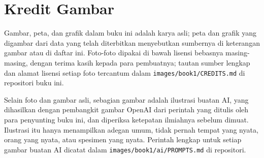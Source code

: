 \chapter*{Kredit Gambar}

Gambar, peta, dan grafik dalam buku ini adalah karya asli; peta dan grafik
yang digambar dari data yang telah diterbitkan menyebutkan sumbernya di
keterangan gambar atau di daftar ini. Foto-foto dipakai di bawah lisensi
bebasnya masing-masing, dengan terima kasih kepada para pembuatnya; tautan
sumber lengkap dan alamat lisensi setiap foto tercantum dalam
\texttt{images/book1/CREDITS.md} di repositori buku ini.

\bigskip
Selain foto dan gambar asli, sebagian gambar adalah ilustrasi buatan AI,
yang dihasilkan dengan pembangkit gambar OpenAI dari perintah yang ditulis
oleh para penyunting buku ini, dan diperiksa ketepatan ilmiahnya sebelum
dimuat. Ilustrasi itu hanya menampilkan adegan umum, tidak pernah tempat
yang nyata, orang yang nyata, atau spesimen yang nyata. Perintah lengkap
untuk setiap gambar buatan AI dicatat dalam
\texttt{images/book1/ai/PROMPTS.md} di repositori.

